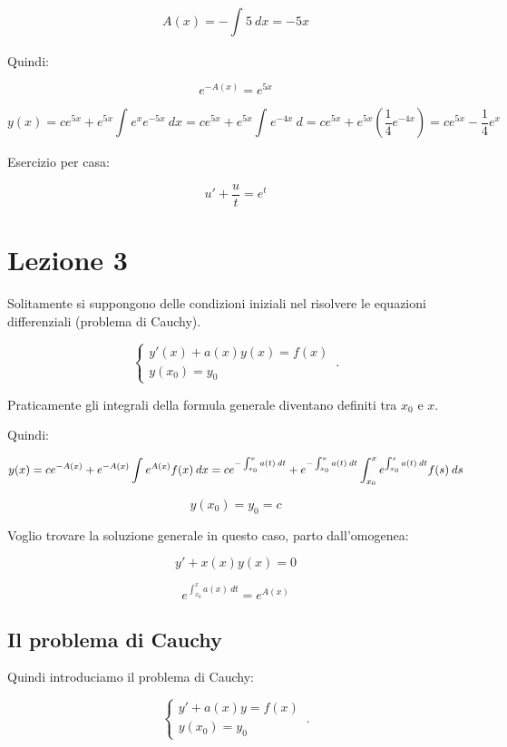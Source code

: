 \documentclass[11pt]{article}
\begin{document}
\[
    A(x) = - \int_{{}}^{{}} {5} \: d{x} {}=-5x
\]

Quindi: 

\[
    e ^{-A(x)}=e ^{5x}
\]

\[
    y(x) = c e ^{5x} + e ^{5x} \int_{{}}^{{}} {e^x e ^{-5x}} \: d{x} {} = c e ^{5x} + e ^{5x} \int_{{}}^{{}} {e ^{-4x}} \: d{} {} = c e ^{5x} + e ^{5x} (\frac{1}{4} e ^{-4x}) = c e ^{5x} - \frac{1}{4} e ^{x}
\]

Esercizio per casa:

\[
    u' + \frac{u}{t} = e ^{t}
\]

\newpage

\section{Lezione 3}

Solitamente si suppongono delle condizioni iniziali nel risolvere le equazioni differenziali (problema di Cauchy).

\begin{equation}
    \begin{cases}
      y'(x)+a(x)y(x)=f(x)\\
      y(x_0)=y_0
    \end{cases}\,.
\end{equation}

Praticamente gli integrali della formula generale diventano definiti tra $x_0$ e $x$.

Quindi:

\[
    y(x) = ce ^{-A(x)}+ e ^{-A(x)} \int_{{}}^{{}} {e ^{A(x)}f(x)} \: d{x} {} = c e ^{-\int_{{x_0}}^{{x}} {a(t)} \: d{t} {}}+e ^{- \int_{{x_0}}^{{x}} {a(t)} \: d{t} {}}\int_{{x_0}}^{{x}} {e ^{\int_{{x_0}}^{{s}} {a(t)} \: d{t} {}}f(s)} \: d{s} {}\\
\]

\[
    y(x_0)=y_0=c
\]


Voglio trovare la soluzione generale in questo caso, parto dall'omogenea:

\[
    y'+x(x)y(x) = 0
\]

\[
    e ^{\int_{{x_0}}^{{x}} {a(x)} \: d{t} {}} = e ^{A(x)}
\]


\subsection{Il problema di Cauchy}

Quindi introduciamo il problema di Cauchy:

\begin{equation}
    \begin{cases}
      y'+a(x)y = f(x)\\
      y(x_0) = y_0
    \end{cases}\,.
\end{equation}
\end{document}
